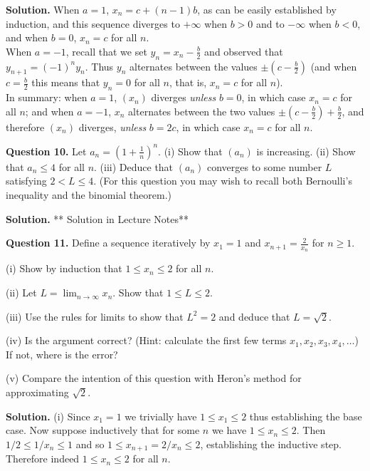 \documentclass[12pt]{article}
\begin{document}
\noindent
{\bf Solution.}
When $a = 1$, $x_n = c + (n-1)b$, as can be easily established by induction, and this sequence diverges to $+\infty$ when $ b >0$ and to $- \infty$ when $b < 0$, and when $b= 0$, $x_n = c$ for all $n$. \\

When $a = -1$, recall that we set $y_n = x_n - \frac{b}{2}$ and observed that $y_{n+1} = (-1)^n y_n$. Thus $y_n$ alternates between the values $\pm (c - \frac{b}{2})$ (and when $c= \frac{b}{2}$ this means that $y_n = 0$ for all $n$, that is, $x_n = c $ for all $n$).\\

\medskip
In summary: when $a = 1$, $(x_n)$ diverges {\em unless} $b=0$, in which case $x_n = c$ for all $n$; and when $a = -1$, $x_n$ alternates between the two values $\pm (c - \frac{b}{2}) + \frac{b}{2}$, and therefore $(x_n)$ diverges, {\em unless} $b = 2c$, in which case $x_n = c$ for all $n$.

\bigskip
{\bf Question 10.}
Let $a_n = \left(1 + \frac{1}{n}\right)^n$. (i) Show that $(a_n)$ is increasing. (ii) Show that $a_n \leq 4$ for all $n$. (iii) Deduce that $(a_n)$ converges to some number $L$ satisfying $2 < L \leq 4$.
(For this question you may wish to recall both Bernoulli's inequality and the binomial theorem.)

\bigskip
{\bf Solution.} ** Solution in Lecture Notes**

\bigskip
{\bf Question 11.}
Define a sequence iteratively by $x_1 = 1$ and $x_{n+1} = \frac{2}{x_n}$ for $n \geq 1$.

(i) Show by induction that $1 \leq x_n \leq 2$ for all $n$.

(ii) Let $L = \lim_{n \to \infty} x_n$. Show that $1 \leq L \leq 2$.

(iii) Use the rules for limits to show that $L^2 = 2$ and deduce that $L =\sqrt{2}$.

(iv) Is the argument correct? (Hint: calculate the first few terms $x_1, x_2, x_3, x_4, \dots$) If not, where is the error?

(v) Compare the intention of this question with Heron's method for approximating $\sqrt{2}$.

\medskip
{\bf Solution.}
(i) Since $x_1 = 1$ we trivially have $1 \leq x_1 \leq 2$ thus establishing the base case. Now suppose inductively that for some $n$ we have $1 \leq x_n \leq 2$. Then $1/2 \leq 1/x_n \leq 1$ and so $1 \leq x_{n+1} = 2/x_n \leq 2$, establishing the inductive step. Therefore indeed $1 \leq x_n \leq 2$ for all $n$.
\end{document}

